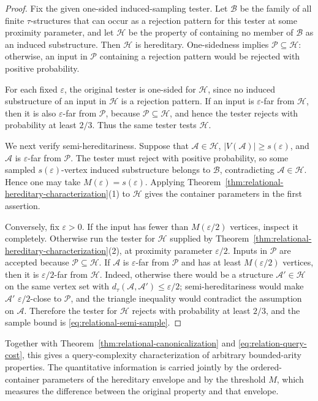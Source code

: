 \documentclass[11pt,reqno,letterpaper]{amsart}
\newcommand{\cA}{{\mathcal A}}
\newcommand{\cB}{{\mathcal B}}
\newcommand{\cH}{{\mathcal H}}
\newcommand{\cP}{{\mathcal P}}
\theoremstyle{plain}
\theoremstyle{remark}
\begin{document}
\begin{proof}
Fix the given one-sided induced-sampling tester.  Let $\cB$ be the family of
all finite $\tau$-structures that can occur as a rejection pattern for this
tester at some proximity parameter, and let $\cH$ be the property of
containing no member of $\cB$ as an induced substructure.  Then $\cH$ is
hereditary.  One-sidedness implies $\cP\subseteq\cH$: otherwise, an input in
$\cP$ containing a rejection pattern would be rejected with positive
probability.

For each fixed $\varepsilon$, the original tester is one-sided for $\cH$,
since no induced substructure of an input in $\cH$ is a rejection pattern.  If
an input is $\varepsilon$-far from $\cH$, then it is also
$\varepsilon$-far from $\cP$, because $\cP\subseteq\cH$, and hence the tester
rejects with probability at least $2/3$.  Thus the same tester tests $\cH$.

We next verify semi-hereditariness.  Suppose that $\cA\in\cH$,
$|V(\cA)|\geq s(\varepsilon)$, and $\cA$ is $\varepsilon$-far from $\cP$.
The tester must reject with positive probability, so some sampled
$s(\varepsilon)$-vertex induced substructure belongs to $\cB$, contradicting
$\cA\in\cH$.  Hence one may take $M(\varepsilon)=s(\varepsilon)$.  Applying
Theorem~\ref{thm:relational-hereditary-characterization}(1) to $\cH$ gives the
container parameters in the first assertion.

Conversely, fix $\varepsilon>0$.  If the input has fewer than
$M(\varepsilon/2)$ vertices, inspect it completely.  Otherwise run the tester
for $\cH$ supplied by
Theorem~\ref{thm:relational-hereditary-characterization}(2), at proximity
parameter $\varepsilon/2$.  Inputs in $\cP$ are accepted because
$\cP\subseteq\cH$.  If $\cA$ is $\varepsilon$-far from $\cP$ and has at least
$M(\varepsilon/2)$ vertices, then it is $\varepsilon/2$-far from $\cH$.
Indeed, otherwise there would be a structure $\cA'\in\cH$ on the same vertex
set with $d_\tau(\cA,\cA')\leq\varepsilon/2$; semi-hereditariness would make
$\cA'$ $\varepsilon/2$-close to $\cP$, and the triangle inequality would
contradict the assumption on $\cA$.  Therefore the tester for $\cH$ rejects
with probability at least $2/3$, and the sample bound is
\eqref{eq:relational-semi-sample}.
\end{proof}

Together with Theorem~\ref{thm:relational-canonicalization} and
\eqref{eq:relation-query-cost}, this gives a query-complexity characterization
of arbitrary bounded-arity properties.  The quantitative information is
carried jointly by the ordered-container parameters of the hereditary envelope
and by the threshold $M$, which measures the difference between the original
property and that envelope.
\end{document}
